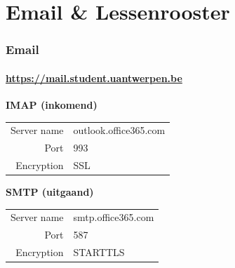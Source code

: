     
\section{Email \& Lessenrooster}
\begin{frame}
	\frametitle{Email}
	\framesubtitle{\url{https://mail.student.uantwerpen.be}}
    \begin{center}
    \end{center}
   	\textbf{IMAP (inkomend)}
    \begin{tabularx}{\linewidth}{rX}
      Server name & outlook.office365.com \\
      Port & 993 \\
      Encryption & SSL \\
	\end{tabularx} \vspace{0.5cm}
    
	\textbf{SMTP (uitgaand)}
    \begin{tabularx}{\linewidth}{rX}
      Server name & smtp.office365.com \\
      Port & 587 \\
      Encryption & STARTTLS \\
	\end{tabularx} \vspace{0.5cm}
    
\end{frame}
    
